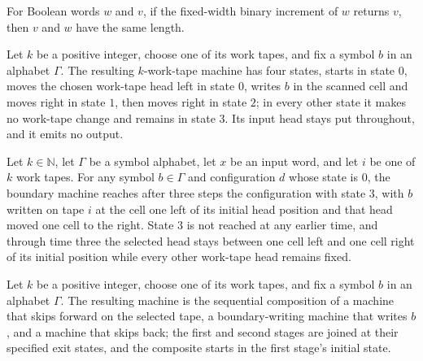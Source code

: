 \begin{theorem}
\label{Turing.rt_incFixed_length}
\leanok
{}
For Boolean words $w$ and $v$, if the fixed-width binary increment of $w$ returns $v$,
then $v$ and $w$ have the same length.
\end{theorem}

\begin{definition}
\label{Turing.rt_boundaryTM}
\leanok
{}
Let $k$ be a positive integer, choose one of its work tapes, and fix a symbol $b$ in an
alphabet $\Gamma$. The resulting $k$-work-tape machine has four states, starts in state
$0$, moves the chosen work-tape head left in state $0$, writes $b$ in the scanned cell
and moves right in state $1$, then moves right in state $2$; in every other state it
makes no work-tape change and remains in state $3$. Its input head stays put throughout,
and it emits no output.
\end{definition}

\begin{theorem}
\label{Turing.rt_boundary_run}
\leanok
{}
Let $k\in\mathbb{N}$, let $\Gamma$ be a symbol alphabet, let $x$ be an input word, and
let $i$ be one of $k$ work tapes. For any symbol $b\in\Gamma$ and configuration $d$
whose state is $0$, the boundary machine reaches after three steps the configuration
with state $3$, with $b$ written on tape $i$ at the cell one left of its initial head
position and that head moved one cell to the right. State $3$ is not reached at any
earlier time, and through time three the selected head stays between one cell left and
one cell right of its initial position while every other work-tape head remains fixed.
\end{theorem}

\begin{definition}
\label{Turing.rt_appendSymbolTM}
\leanok
{}
Let $k$ be a positive integer, choose one of its work tapes, and fix a symbol $b$ in an
alphabet $\Gamma$. The resulting machine is the sequential composition of a machine that
skips forward on the selected tape, a boundary-writing machine that writes $b$, and a
machine that skips back; the first and second stages are joined at their specified exit
states, and the composite starts in the first stage's initial state.
\end{definition}

